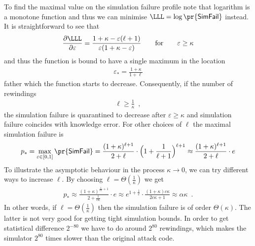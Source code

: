 \documentclass{crypto-exercise}
\newcommand{\SFAIL}{\mathsf{SimFail}}
\begin{document}
\begin{solution}
To find the maximal value on the simulation failure profile note that logarithm is a monotone function and thus we can minimise $\LLL=\log\pr{\SFAIL}$ instead. It is straightforward to see that 
\begin{align*}
\frac{\partial\LLL}{\partial\varepsilon}=\frac{1+\kappa-\varepsilon(\ell+1)}{\varepsilon(1+\kappa-\varepsilon)}\qquad \text{for}\qquad \varepsilon \geq\kappa
\end{align*}   
and thus the function is bound to have a single maximum in the location 
\begin{align*}
\varepsilon_*=\frac{1+\kappa}{1+\ell}
\end{align*}
father which the function starts to decrease. Consequently, if the number of rewindings \begin{align*}
\ell\geq \frac{1}{\kappa}\enspace,
\end{align*} 
the simulation failure is quarantined to decrease after $\varepsilon\geq \kappa$ and simulation failure coincides with knowledge error. For other choices of $\ell$ the maximal simulation failure is 
\begin{align*}
p_*=\max_{\varepsilon\in[0,1]}\pr{\SFAIL}
=\frac{(1+\kappa)^{\ell+1}}{2+\ell}\cdot\Bigl(1+\frac{1}{\ell+1}\Bigr)^{\ell+1}\approx \frac{(1+\kappa)^{\ell+1}}{2+\ell}\cdot e
\end{align*}
To illustrate the asymptotic behaviour in the process $\kappa\to 0$, we can try different ways to increase $\ell$. By choosing $\ell=\Theta(\frac{1}{\kappa})$ we get
\begin{align*}
p_*\approx\frac{(1+\kappa)^{\frac{1}{c\kappa}+1}}{2+\frac{1}{c\kappa}}\cdot e\approx
e^{1+\frac{1}{c}}\cdot\frac{(1+\kappa)c\kappa}{2c\kappa+1}\approx \alpha\kappa\enspace.
\end{align*}  
In other words, if $\ell=\Theta(\frac{1}{\kappa})$ then the simulation failure is of order $\Theta(\kappa)$. The latter is not very good for getting tight simulation bounds. In order to get statistical difference $2^{-80}$ we have to do around $2^{80}$ rewindings, which makes the simulator $2^{80}$ times slower than the original attack code. 


\end{solution}
\end{document}
